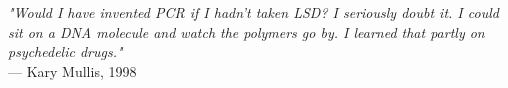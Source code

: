\begin{flushright}
\emph{"Would I have invented PCR if I hadn’t taken LSD? I seriously doubt it. I could sit on a DNA molecule and watch the polymers go by. I learned that partly on psychedelic drugs."}\\
— Kary Mullis, 1998
\end{flushright}